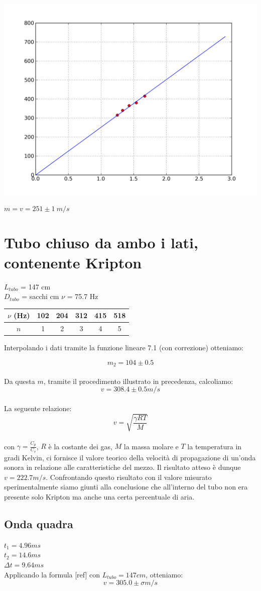 \begin{center}
\includegraphics[scale=0.5]{../grafici/tubo/tubo3.png}

$m = v = 251\pm 1\ m/s$
\end{center}

\section{Tubo chiuso da ambo i lati, contenente Kripton}

$L_{tubo}$ = 147 cm\\
$D_{tubo}$ = sacchi cm
$\nu$ = 75.7 Hz
 


\begin{center}
\begin{tabular}{c|c|c|c|c|c}
$\nu$ (Hz) & 102 & 204 & 312 & 415 & 518 \\
\midrule
$n$ & 1 & 2 & 3 & 4 & 5\\
\end{tabular}
\end{center}

Interpolando i dati tramite la funzione lineare 7.1 (con correzione) otteniamo:

$$ m_2 = 104 \pm 0.5  $$ 
\\
Da questa $m$, tramite il procedimento illustrato in precedenza, calcoliamo: 
$$v = 308.4\pm0.5 m/s $$
\\
La seguente relazione:
$$v=\sqrt{\frac{\gamma RT}{M}}$$
\\
con $\gamma = \frac{C_p}{C_v}$, $R$ è la costante dei gas, $M$ la massa molare e $T$ la temperatura in gradi Kelvin, ci fornisce il valore teorico della velocità di propagazione di un'onda sonora in relazione alle caratteristiche del mezzo. 
Il risultato atteso è dunque $v=222.7 m/s$. Confrontando questo risultato con il valore misurato sperimentalmente siamo giunti alla conclusione che all'interno del tubo non era presente solo Kripton ma anche una certa percentuale di aria.

\subsection{Onda quadra}
$t_1 = 4.96 ms $\\
$t_2 = 14.6 ms $\\
$\Delta t = 9.64 ms $ \\
Applicando la formula [ref] con $L_{tubo} = 147 cm$, otteniamo:
$$ v = 305.0 \pm \sigma m/s $$ 


